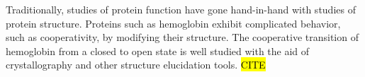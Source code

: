 \documentclass[../AdvancementSummary.tex]{subfiles}
\begin{document}
%
%
%
%
%


%
%


Traditionally, studies of protein function have gone hand-in-hand with studies of protein structure. Proteins such as hemoglobin exhibit complicated behavior, such as cooperativity, by modifying their structure. The cooperative transition of hemoglobin from a closed to open state is well studied with the aid of crystallography and other structure elucidation tools. \hl{CITE} 
\end{document}
